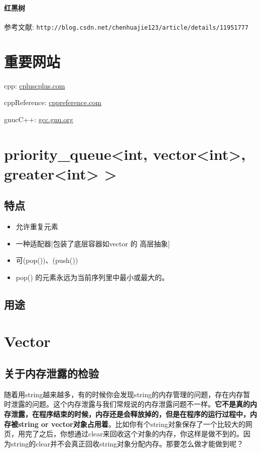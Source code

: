 \documentclass[UTF8,a4paper,12pt]{ctexbook}
\begin{document}
		\paragraph{红黑树}
			参考文献: \verb|http://blog.csdn.net/chenhuajie123/article/details/11951777|
	
	\section{重要网站}
		
		cpp: \url{cpluscplus.com}
		
		cppReference: \url{cppreference.com}
		
		gnucC++: \url{gcc.gnu.org}		
			
\newpage
	\section{priority\_queue<int, vector<int>, greater<int> >}
		\subsection{特点}
			\begin{itemize}
				\item 允许重复元素
				\item 一种适配器[包装了底层容器如vector 的 高层抽象]
				\item 可(pop())、(push())
				\item pop() 的元素永远为当前序列里中最小或最大的。
			\end{itemize}
		\subsection{用途}


\newpage
	\section{Vector}
		\subsection{关于内存泄露的检验}
			随着用string越来越多，有的时候你会发现string的内存管理的问题，存在内存暂时泄露的问题。这个内存泄露与我们常规说的内存泄露问题不一样。\textbf{它不是真的内存泄露，在程序结束的时候，内存还是会释放掉的，但是在程序的运行过程中，内存被string or  vector对象占用着}。比如你有个string对象保存了一个比较大的网页，用完了之后，你想通过clear来回收这个对象的内存，你这样是做不到的。因为string的clear并不会真正回收string对象分配内存。那要怎么做才能做到呢？
		
\end{document}
